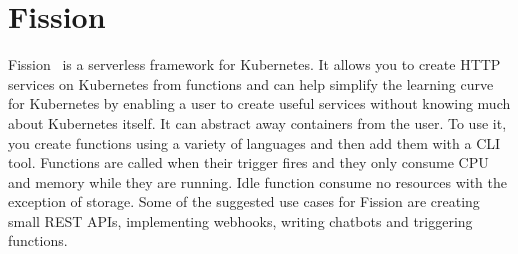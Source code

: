 \section{Fission}
Fission~\cite{hid-sp18-521-FissionBlog} is a serverless framework for
Kubernetes. It allows you to create HTTP services on Kubernetes from
functions and can help simplify the learning curve for Kubernetes by
enabling a user to create useful services without knowing much about
Kubernetes itself. It can abstract away containers from the user. 
To use it, you create functions using a variety of languages and then
add them with a CLI tool. Functions are called when their trigger fires and 
they only consume CPU and memory while they are running. Idle function 
consume no resources with the exception of storage. Some of the 
suggested use cases for Fission are creating small REST APIs, 
implementing webhooks, writing chatbots and triggering functions.
